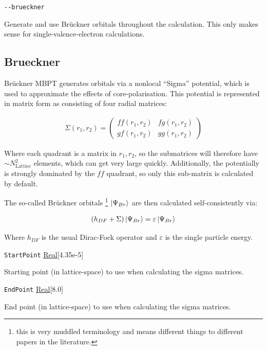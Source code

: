 \documentclass{report}
\begin{document}
\texttt{{-}{-}brueckner}
\begin{adjustwidth}{1cm}{}
Generate and use Br\"{u}ckner orbitals throughout the calculation. This only makes sense for
single-valence-electron calculations.
\end{adjustwidth}

\subsection{Brueckner}

Br\"{u}ckner MBPT generates orbitals via a nonlocal ``Sigma'' potential, which is used to approximate
the effects of core-polarisation. This potential is represented in matrix 
form as consisting of four radial matrices:

\begin{align}
\Sigma(r_1, r_2) = 
\begin{pmatrix}
ff(r_1, r_2)    & fg(r_1, r_2)\\
gf(r_1, r_2)    & gg(r_1, r_2)
\end{pmatrix}
\end{align}

Where each quadrant is a matrix in $r_1, r_2$, so the submatrices will therefore have $\sim
N_{\mathrm{Lattice}}^2$ elements, which can get very large quickly. Additionally, the potentially is
strongly dominated by the $ff$ quadrant, so only this sub-matrix is calculated by default.

The so-called Br\"{u}ckner orbitals \footnote{this is very muddled terminology and 
means different things to different papers in the literature. } $\ket{\Psi_{Br}}$ are then calculated 
self-consistently via:

\begin{align}
\label{eq:brueckner}
(h_{DF} + \Sigma) \ket{\Psi_{Br}} = \varepsilon \ket{\Psi_{Br}}
\end{align}

Where $h_{DF}$ is the usual Dirac-Fock operator and $\varepsilon$ is the single particle energy.

\texttt{StartPoint} \uline{Real}[4.35e-5]
\begin{adjustwidth}{1cm}{}
Starting point (in lattice-space) to use when calculating the sigma matrices.
\end{adjustwidth}

\texttt{EndPoint} \uline{Real}[8.0]
\begin{adjustwidth}{1cm}{}
End point (in lattice-space) to use when calculating the sigma matrices.
\end{adjustwidth}
\end{document}
